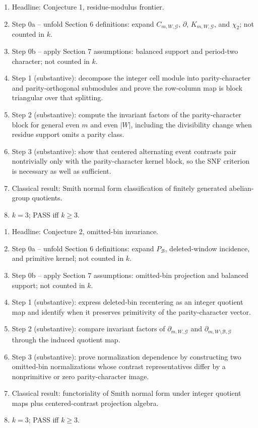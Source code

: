 \documentclass[11pt]{article}
\theoremstyle{definition}
\theoremstyle{plain}
\theoremstyle{remark}
\begin{document}
\begin{enumerate}[leftmargin=*]
\item Headline: Conjecture 1, residue-modulus frontier.
\item Step 0a -- unfold Section 6 definitions: expand \(C_{m,W,\mathcal G}\), \(\partial\), \(K_{m,W,\mathcal G}\), and \(\chi_2\); not counted in \(k\).
\item Step 0b -- apply Section 7 assumptions: balanced support and period-two character; not counted in \(k\).
\item Step 1 (substantive): decompose the integer cell module into parity-character and parity-orthogonal submodules and prove the row-column map is block triangular over that splitting.
\item Step 2 (substantive): compute the invariant factors of the parity-character block for general even \(m\) and even \(|W|\), including the divisibility change when residue support omits a parity class.
\item Step 3 (substantive): show that centered alternating event contrasts pair nontrivially only with the parity-character kernel block, so the SNF criterion is necessary as well as sufficient.
\item Classical result: Smith normal form classification of finitely generated abelian-group quotients.
\item \(k=3\); PASS iff \(k\ge 3\).
\end{enumerate}

\begin{enumerate}[leftmargin=*]
\item Headline: Conjecture 2, omitted-bin invariance.
\item Step 0a -- unfold Section 6 definitions: expand \(P_{\mathcal B}\), deleted-window incidence, and primitive kernel; not counted in \(k\).
\item Step 0b -- apply Section 7 assumptions: omitted-bin projection and balanced support; not counted in \(k\).
\item Step 1 (substantive): express deleted-bin recentering as an integer quotient map and identify when it preserves primitivity of the parity-character vector.
\item Step 2 (substantive): compare invariant factors of \(\partial_{m,W,\mathcal G}\) and \(\partial_{m,W\setminus\mathcal B,\mathcal G}\) through the induced quotient map.
\item Step 3 (substantive): prove normalization dependence by constructing two omitted-bin normalizations whose contrast representatives differ by a nonprimitive or zero parity-character image.
\item Classical result: functoriality of Smith normal form under integer quotient maps plus centered-contrast projection algebra.
\item \(k=3\); PASS iff \(k\ge 3\).
\end{enumerate}
\end{document}
